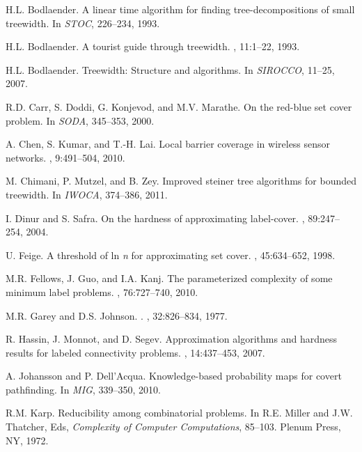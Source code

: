 \documentclass[12pt]{article}
\begin{document}
\bigskip\bigskip\bigskip
{\small


\begin{thebibliography}{10}

H.L. Bodlaender.
\newblock A linear time algorithm for finding tree-decompositions of small
  treewidth.
\newblock In {\em STOC}, 226--234, 1993.

H.L. Bodlaender.
\newblock A tourist guide through treewidth.
, 11:1--22, 1993.

H.L. Bodlaender.
\newblock Treewidth: Structure and algorithms.
\newblock In {\em SIROCCO}, 11--25, 2007.

R.D. Carr, S. Doddi, G. Konjevod, and M.V. Marathe.
\newblock On the red-blue set cover problem.
\newblock In {\em SODA}, 345--353, 2000.

A. Chen, S. Kumar, and T.-H. Lai.
\newblock Local barrier coverage in wireless sensor networks.
, 9:491--504, 2010.

M. Chimani, P. Mutzel, and B. Zey.
\newblock Improved steiner tree algorithms for bounded treewidth.
\newblock In {\em IWOCA}, 374--386, 2011.

I. Dinur and S. Safra.
\newblock On the hardness of approximating label-cover.
, 89:247--254, 2004.

U. Feige.
\newblock A threshold of ln {\it n} for approximating set cover.
, 45:634--652, 1998.

M.R. Fellows, J. Guo, and I.A. Kanj.
\newblock The parameterized complexity of some minimum label problems.
, 76:727--740, 2010.

M.R. Garey and D.S. Johnson.
.
, 32:826--834, 1977.

R. Hassin, J. Monnot, and D. Segev.
\newblock Approximation algorithms and hardness results for labeled
  connectivity problems.
, 14:437--453, 2007.

A. Johansson and P. Dell'Acqua.
\newblock Knowledge-based probability maps for covert pathfinding.
\newblock In {\em MIG}, 339--350, 2010.

R.M. Karp.
\newblock Reducibility among combinatorial problems.
\newblock In R.E. Miller and J.W. Thatcher, Eds, {\em Complexity of
  Computer Computations},  85--103. Plenum Press, NY, 1972.


\end{thebibliography}}
\end{document}
